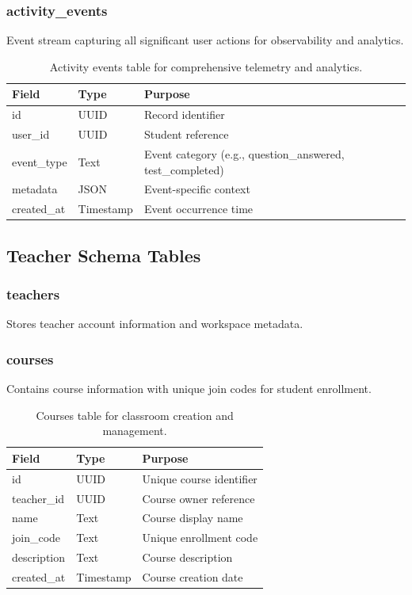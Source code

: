 \documentclass[sigconf,authordraft,twoside]{acmart}
\begin{document}
\subsubsection{activity\_events}
Event stream capturing all significant user actions for observability and analytics.

\begin{table}[t]
\centering
\small
\begin{tabularx}{\columnwidth}{>{\raggedright\arraybackslash}p{} >{\raggedright\arraybackslash}p{} X}
\toprule
\textbf{Field} & \textbf{Type} & \textbf{Purpose} \\
\midrule
id & UUID & Record identifier \\
user\_id & UUID & Student reference \\
event\_type & Text & Event category (e.g., question\_answered, test\_completed) \\
metadata & JSON & Event-specific context \\
created\_at & Timestamp & Event occurrence time \\
\bottomrule
\end{tabularx}
\caption{Activity events table for comprehensive telemetry and analytics.}
\end{table}

\subsection{Teacher Schema Tables}

\subsubsection{teachers}
Stores teacher account information and workspace metadata.

\subsubsection{courses}
Contains course information with unique join codes for student enrollment.

\begin{table}[t]
\centering
\small
\begin{tabularx}{\columnwidth}{>{\raggedright\arraybackslash}p{} >{\raggedright\arraybackslash}p{} X}
\toprule
\textbf{Field} & \textbf{Type} & \textbf{Purpose} \\
\midrule
id & UUID & Unique course identifier \\
teacher\_id & UUID & Course owner reference \\
name & Text & Course display name \\
join\_code & Text & Unique enrollment code \\
description & Text & Course description \\
created\_at & Timestamp & Course creation date \\
\bottomrule
\end{tabularx}
\caption{Courses table for classroom creation and management.}
\end{table}
\end{document}
